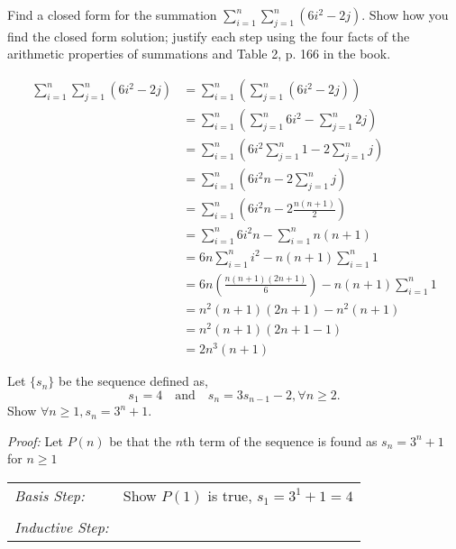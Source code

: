 \begin{questions}
\bonusquestion[4] Find a closed form for the summation $\displaystyle \sum_{i=1}^n \sum_{j=1}^n (6i^2 - 2j)$.  Show how you find the closed form solution; justify each step using the four facts of the arithmetic properties of summations and Table 2, p. 166 in the book.
    \ifprintanswers
        \vspace{-10pt}
   \fi
\begin{solution}
\begin{align*}
        \sum_{i=1}^n \sum_{j=1}^n (6i^2 - 2j) 
        &= \sum_{i=1}^n ( \sum_{j=1}^n (6i^2 - 2j) ) \tag{implied parentheses} \\
        &= \sum_{i=1}^n (\sum_{j=1}^n 6i^2 - \sum_{j=1}^n 2j) \tag{Fact 3} \\
        &= \sum_{i=1}^n (6i^2 \sum_{j=1}^n 1 - 2 \sum_{j=1}^n j) \tag{Fact 4, twice} \\
        &= \sum_{i=1}^n (6i^2n - 2 \sum_{j=1}^n j) \tag{Fact 1} \\
        &= \sum_{i=1}^n (6i^2n - 2 \frac{n(n+1)}{2}) \tag{Table 2} \\
        &= \sum_{i=1}^n 6i^2n - \sum_{i=1}^n  n(n+1) \tag{Fact 3} \\
        &= 6n \sum_{i=1}^n i^2 - n(n+1) \sum_{i=1}^n 1 \tag{Fact 4, twice} \\
        &= 6n (\frac{n(n+1)(2n+1)}{6}) - n(n+1) \sum_{i=1}^n 1 \tag{Table 2} \\
        &= n^2(n+1)(2n+1) - n^2(n+1) \tag{algebra} \\
        &= n^2(n+1)(2n + 1  - 1) \\
        &= 2n^3(n+1) 
    \end{align*}
\end{solution}



\bonusquestion[4] Let $\{s_n\}$ be the sequence defined as, 
\[ s_1 = 4 \quad \text{and} \quad s_n = 3s_{n-1} - 2, \forall n \geq 2. \]
Show $\forall n \geq 1, s_n = 3^n + 1.$
    \ifprintanswers
        \vspace{-10pt}
   \fi
\begin{solution}
  \textit{Proof:}
  Let $P(n)$ be that the $n$th term of the sequence is found as $s_n = 3^n + 1$ for $n \geq 1$

  \smallskip
  \begin{tabular}{lp{4in}}
    \textit{Basis Step:} & Show $P(1)$ is true, $s_1 = 3^1 + 1 = 4$ \\
     & \\
   \textit{Inductive Step:} &  \\
  \end{tabular}


\end{solution}
\end{questions}
